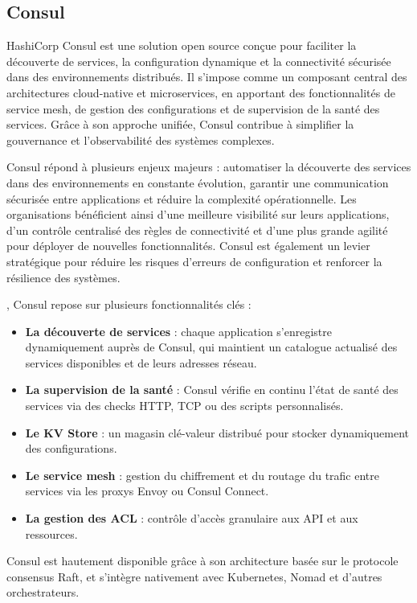 \subsection{Consul}

HashiCorp Consul est une solution open source conçue pour faciliter la découverte de services, la configuration dynamique et la connectivité sécurisée dans des environnements distribués. Il s’impose comme un composant central des architectures cloud-native et microservices, en apportant des fonctionnalités de service mesh, de gestion des configurations et de supervision de la santé des services. Grâce à son approche unifiée, Consul contribue à simplifier la gouvernance et l’observabilité des systèmes complexes.

 Consul répond à plusieurs enjeux majeurs  : automatiser la découverte des services dans des environnements en constante évolution, garantir une communication sécurisée entre applications et réduire la complexité opérationnelle. Les organisations bénéficient ainsi d’une meilleure visibilité sur leurs applications, d’un contrôle centralisé des règles de connectivité et d’une plus grande agilité pour déployer de nouvelles fonctionnalités. Consul est également un levier stratégique pour réduire les risques d’erreurs de configuration et renforcer la résilience des systèmes.

, Consul repose sur plusieurs fonctionnalités clés  :
\begin{itemize}
	\item \textbf{La découverte de services}  : chaque application s’enregistre dynamiquement auprès de Consul, qui maintient un catalogue actualisé des services disponibles et de leurs adresses réseau.
	\item \textbf{La supervision de la santé}  : Consul vérifie en continu l’état de santé des services via des checks HTTP, TCP ou des scripts personnalisés.
	\item \textbf{Le KV Store}  : un magasin clé-valeur distribué pour stocker dynamiquement des configurations.
	\item \textbf{Le service mesh}  : gestion du chiffrement et du routage du trafic entre services via les proxys Envoy ou Consul Connect.
	\item \textbf{La gestion des ACL}  : contrôle d’accès granulaire aux API et aux ressources.
\end{itemize}

Consul est hautement disponible grâce à son architecture basée sur le protocole consensus Raft, et s’intègre nativement avec Kubernetes, Nomad et d’autres orchestrateurs.

